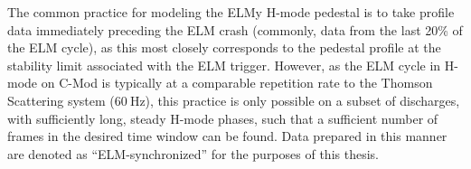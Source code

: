 The common practice for modeling the ELMy H-mode pedestal is to take profile data immediately preceding the ELM crash (commonly, data from the last 20\% of the ELM cycle), as this most closely corresponds to the pedestal profile at the stability limit associated with the ELM trigger.  However, as the ELM cycle in H-mode on C-Mod is typically at a comparable repetition rate to the Thomson Scattering system ($\SI{60}{\hertz}$), this practice is only possible on a subset of discharges, with sufficiently long, steady H-mode phases, such that a sufficient number of frames in the desired time window can be found.  Data prepared in this manner are denoted as ``ELM-synchronized'' for the purposes of this thesis.

\begin{figure}[h]
 \pushtooutside
\end{figure}

